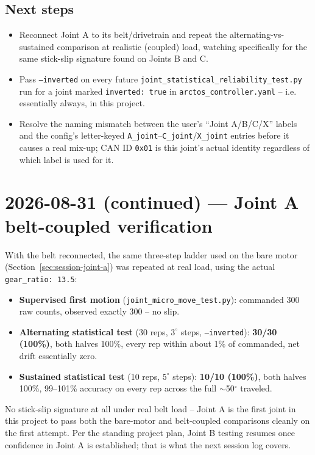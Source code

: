 \documentclass[11pt,letterpaper]{article}
\begin{document}
\subsection{Next steps}
\begin{itemize}
    \item Reconnect Joint A to its belt/drivetrain and repeat the alternating-vs-sustained comparison at realistic (coupled) load, watching specifically for the same stick-slip signature found on Joints B and C.
    \item Pass \texttt{--inverted} on every future \texttt{joint\_statistical\_reliability\_test.py} run for a joint marked \texttt{inverted: true} in \texttt{arctos\_controller.yaml} -- i.e. essentially always, in this project.
    \item Resolve the naming mismatch between the user's ``Joint A/B/C/X'' labels and the config's letter-keyed \texttt{A\_joint}--\texttt{C\_joint}/\texttt{X\_joint} entries before it causes a real mix-up; CAN ID \texttt{0x01} is this joint's actual identity regardless of which label is used for it.
\end{itemize}

\section{2026-08-31 (continued) --- Joint A belt-coupled verification}
\label{sec:session-joint-a-coupled}

With the belt reconnected, the same three-step ladder used on the bare motor (Section~\ref{sec:session-joint-a}) was repeated at real load, using the actual \texttt{gear\_ratio: 13.5}:
\begin{itemize}
    \item \textbf{Supervised first motion} (\texttt{joint\_micro\_move\_test.py}): commanded 300 raw counts, observed exactly 300 -- no slip.
    \item \textbf{Alternating statistical test} (30 reps, $3^\circ$ steps, \texttt{--inverted}): \textbf{30/30 (100\%)}, both halves 100\%, every rep within about 1\% of commanded, net drift essentially zero.
    \item \textbf{Sustained statistical test} (10 reps, $5^\circ$ steps): \textbf{10/10 (100\%)}, both halves 100\%, 99--101\% accuracy on every rep across the full $\sim$50$^\circ$ traveled.
\end{itemize}
No stick-slip signature at all under real belt load -- Joint A is the first joint in this project to pass both the bare-motor and belt-coupled comparisons cleanly on the first attempt. Per the standing project plan, Joint B testing resumes once confidence in Joint A is established; that is what the next session log covers.
\end{document}
